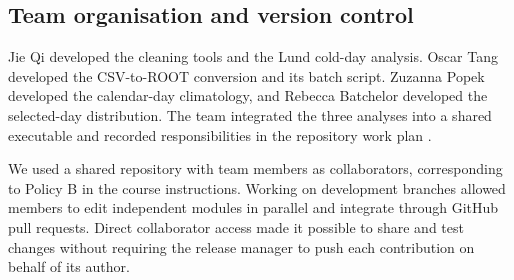 \subsection{Team organisation and version control}
Jie Qi developed the cleaning tools and the Lund cold-day analysis. Oscar Tang developed the CSV-to-ROOT conversion and its batch script. Zuzanna Popek developed the calendar-day climatology, and Rebecca Batchelor developed the selected-day distribution. The team integrated the three analyses into a shared executable and recorded responsibilities in the repository work plan \cite{repo}.

We used a shared repository with team members as collaborators, corresponding to Policy B in the course instructions. Working on development branches allowed members to edit independent modules in parallel and integrate through GitHub pull requests. Direct collaborator access made it possible to share and test changes without requiring the release manager to push each contribution on behalf of its author.
